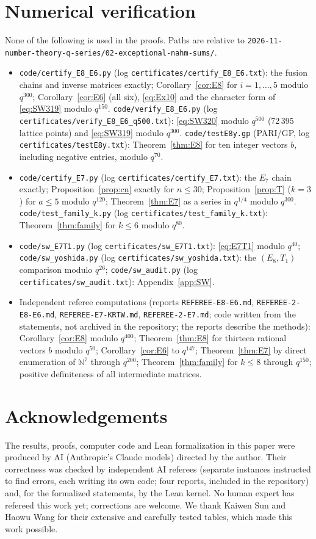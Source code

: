 \documentclass[11pt]{amsart}
\theoremstyle{definition}
\numberwithin{equation}{section}
\newcommand{\N}{\mathbb{N}}
\newcommand{\repo}{\nolinkurl{2026-11-number-theory-q-series/}}
\newcommand{\fpath}[1]{\nolinkurl{#1}}
\begin{document}
\section{Numerical verification}\label{sec:num}
None of the following is used in the proofs. Paths are relative to
\repo\fpath{02-exceptional-nahm-sums/}.
\begin{itemize}[leftmargin=1.5em]
\item \fpath{code/certify_E8_E6.py} (log \fpath{certificates/certify_E8_E6.txt}): the fusion chains and
inverse matrices exactly; Corollary~\ref{cor:E8} for $i=1,\dots,5$ modulo $q^{300}$; Corollary~\ref{cor:E6}
(all six), \eqref{eq:Ex10} and the character form of \eqref{eq:SW319} modulo $q^{150}$.
\fpath{code/verify_E8_E6.py} (log \fpath{certificates/verify_E8_E6_q500.txt}): \eqref{eq:SW320} modulo
$q^{500}$ (72\,395 lattice points) and \eqref{eq:SW319} modulo $q^{300}$. \fpath{code/testE8y.gp}
(PARI/GP, log \fpath{certificates/testE8y.txt}): Theorem~\ref{thm:E8} for ten integer vectors $b$,
including negative entries, modulo $q^{70}$.
\item \fpath{code/certify_E7.py} (log \fpath{certificates/certify_E7.txt}): the $E_7$ chain exactly;
Proposition~\ref{prop:cn} exactly for $n\le30$; Proposition~\ref{prop:T} ($k=3$) for $a\le5$ modulo
$q^{120}$; Theorem~\ref{thm:E7} as a series in $q^{1/4}$ modulo $q^{300}$. \fpath{code/test_family_k.py}
(log \fpath{certificates/test_family_k.txt}): Theorem~\ref{thm:family} for $k\le6$ modulo $q^{80}$.
\item \fpath{code/sw_E7T1.py} (log \fpath{certificates/sw_E7T1.txt}): \eqref{eq:E7T1} modulo $q^{40}$;
\fpath{code/sw_yoshida.py} (log \fpath{certificates/sw_yoshida.txt}): the $(E_8,T_1)$ comparison modulo $q^{26}$; \fpath{code/sw_audit.py}
(log \fpath{certificates/sw_audit.txt}): Appendix~\ref{app:SW}.
\item Independent referee computations (reports \fpath{REFEREE-E8-E6.md}, \fpath{REFEREE-2-E8-E6.md},
\fpath{REFEREE-E7-KRTW.md}, \fpath{REFEREE-2-E7.md}; code written from the statements, not archived in
the repository; the reports describe the methods):
Corollary~\ref{cor:E8} modulo $q^{400}$; Theorem~\ref{thm:E8} for thirteen rational vectors $b$ modulo
$q^{50}$; Corollary~\ref{cor:E6} to $q^{147}$; Theorem~\ref{thm:E7} by direct enumeration of $\N^7$ through
$q^{200}$; Theorem~\ref{thm:family} for $k\le8$ through $q^{150}$; positive definiteness of all
intermediate matrices.
\end{itemize}

\section*{Acknowledgements}
The results, proofs, computer code and Lean formalization in this paper were produced by AI (Anthropic's
Claude models) directed by the author. Their correctness was checked by independent AI referees
(separate instances instructed to find errors, each writing its own code; four reports, included in the
repository) and, for the formalized statements, by the Lean kernel. No human expert has refereed this
work yet; corrections are welcome. We thank Kaiwen Sun and Haowu Wang for their extensive and carefully
tested tables, which made this work possible.
\end{document}
